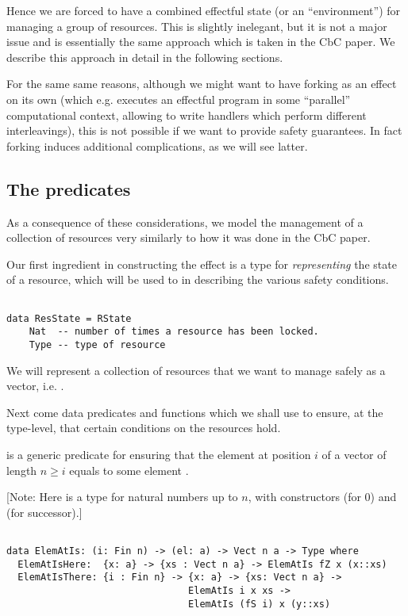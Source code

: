 Hence we are forced to have a combined effectful state (or an ``environment'')
for managing a group of resources. This is slightly inelegant, but it is not a
major issue and is essentially the same approach which is taken in the CbC
paper. We describe this approach in detail in the following sections.

For the same same reasons, although we might want to have forking as an effect
on its own (which e.g. executes an effectful program in some ``parallel''
computational context, allowing to write handlers which perform different
interleavings), this is not possible if we want to provide safety guarantees.
In fact forking induces additional complications, as we will see latter.

\subsection{The predicates}

As a consequence of these considerations, we model the management of a
collection of resources very similarly to how it was done in the CbC paper.

Our first ingredient in constructing the effect is a type for
\emph{representing} the state of a resource, which will be used to in
describing the various safety conditions.

\begin{BVerbatim}

data ResState = RState
    Nat  -- number of times a resource has been locked.
    Type -- type of resource

\end{BVerbatim}

We will represent a collection of resources that we want to manage safely as a
vector, i.e. .

Next come data predicates and functions which we shall use to ensure, at the
type-level, that certain conditions on the resources hold.

 is a generic predicate for ensuring that the element at
position $i$ of a vector of length $n \geq i$ equals to some element .

[Note: Here  is a type for natural numbers up to $n$, with constructors
 (for $0$) and  (for successor).]

\begin{BVerbatim}

data ElemAtIs: (i: Fin n) -> (el: a) -> Vect n a -> Type where
  ElemAtIsHere:  {x: a} -> {xs : Vect n a} -> ElemAtIs fZ x (x::xs)
  ElemAtIsThere: {i : Fin n} -> {x: a} -> {xs: Vect n a} ->
                                ElemAtIs i x xs ->
                                ElemAtIs (fS i) x (y::xs)

\end{BVerbatim}

